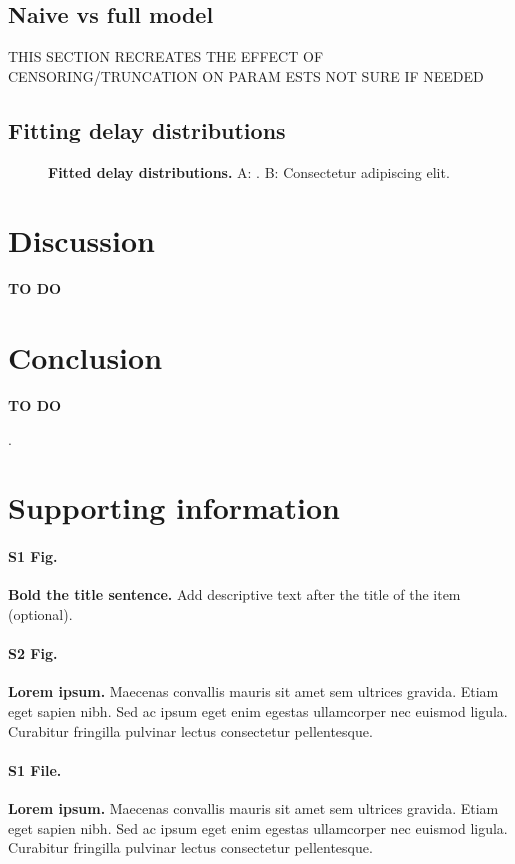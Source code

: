 \documentclass[10pt,letterpaper]{article}
\begin{document}
\subsection{Naive vs full model}
THIS SECTION RECREATES THE EFFECT OF CENSORING/TRUNCATION ON PARAM ESTS 
NOT SURE IF NEEDED

\subsection{Fitting delay distributions}

\begin{figure}[!h]
\caption{{\bf Fitted delay distributions.}
A: . B: Consectetur adipiscing elit.}
\label{fig1}
\end{figure}


\section*{Discussion}
\textbf{TO DO}


\section*{Conclusion}
\textbf{TO DO}


 
 
.

\section*{Supporting information}

\paragraph*{S1 Fig.}
\label{S1_Fig}
{\bf Bold the title sentence.} Add descriptive text after the title of the item (optional).

\paragraph*{S2 Fig.}
\label{S2_Fig}
{\bf Lorem ipsum.} Maecenas convallis mauris sit amet sem ultrices gravida. Etiam eget sapien nibh. Sed ac ipsum eget enim egestas ullamcorper nec euismod ligula. Curabitur fringilla pulvinar lectus consectetur pellentesque.

\paragraph*{S1 File.}
\label{S1_File}
{\bf Lorem ipsum.}  Maecenas convallis mauris sit amet sem ultrices gravida. Etiam eget sapien nibh. Sed ac ipsum eget enim egestas ullamcorper nec euismod ligula. Curabitur fringilla pulvinar lectus consectetur pellentesque.
\end{document}

